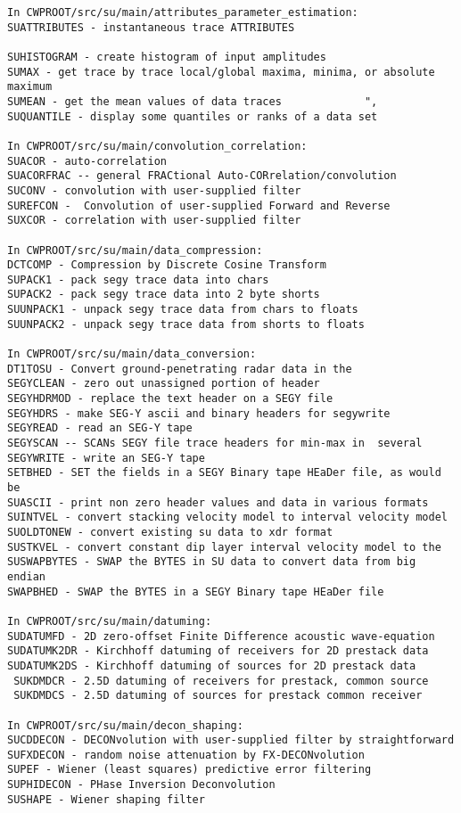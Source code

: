 {{\begin{verbatim}
In CWPROOT/src/su/main/attributes_parameter_estimation:
SUATTRIBUTES - instantaneous trace ATTRIBUTES 			

SUHISTOGRAM - create histogram of input amplitudes		
SUMAX - get trace by trace local/global maxima, minima, or absolute maximum
SUMEAN - get the mean values of data traces				",	
SUQUANTILE - display some quantiles or ranks of a data set            

In CWPROOT/src/su/main/convolution_correlation:
SUACOR - auto-correlation						
SUACORFRAC -- general FRACtional Auto-CORrelation/convolution		
SUCONV - convolution with user-supplied filter			
SUREFCON -  Convolution of user-supplied Forward and Reverse		
SUXCOR - correlation with user-supplied filter			

In CWPROOT/src/su/main/data_compression:
DCTCOMP - Compression by Discrete Cosine Transform			
SUPACK1 - pack segy trace data into chars			
SUPACK2 - pack segy trace data into 2 byte shorts		
SUUNPACK1 - unpack segy trace data from chars to floats	
SUUNPACK2 - unpack segy trace data from shorts to floats	

In CWPROOT/src/su/main/data_conversion:
DT1TOSU - Convert ground-penetrating radar data in the	
SEGYCLEAN - zero out unassigned portion of header		
SEGYHDRMOD - replace the text header on a SEGY file		
SEGYHDRS - make SEG-Y ascii and binary headers for segywrite		
SEGYREAD - read an SEG-Y tape						
SEGYSCAN -- SCANs SEGY file trace headers for min-max in  several	
SEGYWRITE - write an SEG-Y tape					
SETBHED - SET the fields in a SEGY Binary tape HEaDer file, as would be
SUASCII - print non zero header values and data in various formats    
SUINTVEL - convert stacking velocity model to interval velocity model	
SUOLDTONEW - convert existing su data to xdr format		
SUSTKVEL - convert constant dip layer interval velocity model to the	
SUSWAPBYTES - SWAP the BYTES in SU data to convert data from big endian
SWAPBHED - SWAP the BYTES in a SEGY Binary tape HEaDer file		

In CWPROOT/src/su/main/datuming:
SUDATUMFD - 2D zero-offset Finite Difference acoustic wave-equation	
SUDATUMK2DR - Kirchhoff datuming of receivers for 2D prestack data	
SUDATUMK2DS - Kirchhoff datuming of sources for 2D prestack data	
 SUKDMDCR - 2.5D datuming of receivers for prestack, common source    
 SUKDMDCS - 2.5D datuming of sources for prestack common receiver 	

In CWPROOT/src/su/main/decon_shaping:
SUCDDECON - DECONvolution with user-supplied filter by straightforward
SUFXDECON - random noise attenuation by FX-DECONvolution              
SUPEF - Wiener (least squares) predictive error filtering		
SUPHIDECON - PHase Inversion Deconvolution				
SUSHAPE - Wiener shaping filter					


\end{verbatim}}}

